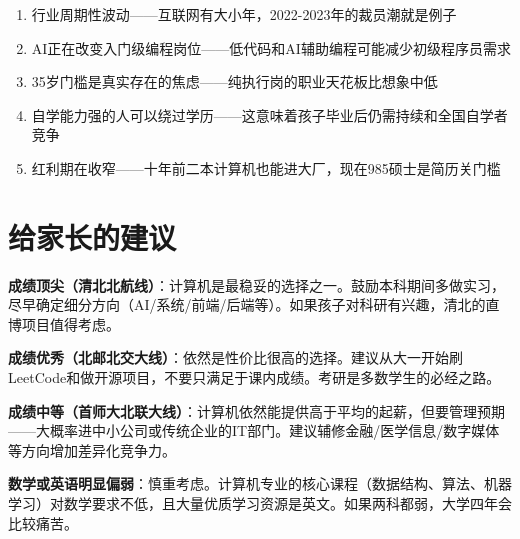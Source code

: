 \documentclass[a4paper,12pt]{ctexart}
\begin{document}
\begin{enumerate}
  \item 行业周期性波动——互联网有大小年，2022-2023年的裁员潮就是例子
  \item AI正在改变入门级编程岗位——低代码和AI辅助编程可能减少初级程序员需求
  \item 35岁门槛是真实存在的焦虑——纯执行岗的职业天花板比想象中低
  \item 自学能力强的人可以绕过学历——这意味着孩子毕业后仍需持续和全国自学者竞争
  \item 红利期在收窄——十年前二本计算机也能进大厂，现在985硕士是简历关门槛
\end{enumerate}

\section{给家长的建议}

\textbf{成绩顶尖（清北北航线）}：计算机是最稳妥的选择之一。鼓励本科期间多做实习，尽早确定细分方向（AI/系统/前端/后端等）。如果孩子对科研有兴趣，清北的直博项目值得考虑。

\textbf{成绩优秀（北邮北交大线）}：依然是性价比很高的选择。建议从大一开始刷LeetCode和做开源项目，不要只满足于课内成绩。考研是多数学生的必经之路。

\textbf{成绩中等（首师大北联大线）}：计算机依然能提供高于平均的起薪，但要管理预期——大概率进中小公司或传统企业的IT部门。建议辅修金融/医学信息/数字媒体等方向增加差异化竞争力。

\textbf{数学或英语明显偏弱}：慎重考虑。计算机专业的核心课程（数据结构、算法、机器学习）对数学要求不低，且大量优质学习资源是英文。如果两科都弱，大学四年会比较痛苦。
\end{document}
